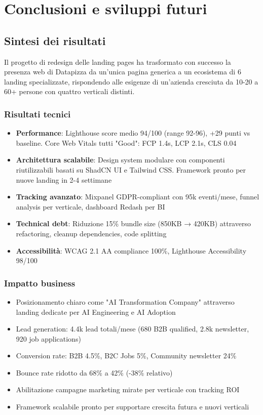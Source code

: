 \chapter{Conclusioni e sviluppi futuri}

\section{Sintesi dei risultati}
Il progetto di redesign delle landing pages ha trasformato con successo 
la presenza web di Datapizza da un'unica pagina generica a un 
ecosistema di 6 landing specializzate, rispondendo alle esigenze di 
un'azienda cresciuta da 10-20 a 60+ persone con quattro verticali 
distinti.

\subsection{Risultati tecnici}
\begin{itemize}
  \item \textbf{Performance}: Lighthouse score medio 94/100 (range 92-96), 
        +29 punti vs baseline. Core Web Vitals tutti "Good": FCP 1.4s, 
        LCP 2.1s, CLS 0.04
  \item \textbf{Architettura scalabile}: Design system modulare con 
        componenti riutilizzabili basati su ShadCN UI e Tailwind CSS. 
        Framework pronto per nuove landing in 2-4 settimane
  \item \textbf{Tracking avanzato}: Mixpanel GDPR-compliant con 95k 
        eventi/mese, funnel analysis per verticale, dashboard Redash 
        per BI
  \item \textbf{Technical debt}: Riduzione 15\% bundle size (850KB → 
        420KB) attraverso refactoring, cleanup dependencies, code splitting
  \item \textbf{Accessibilità}: WCAG 2.1 AA compliance 100\%, 
        Lighthouse Accessibility 98/100
\end{itemize}

\subsection{Impatto business}
\begin{itemize}
  \item Posizionamento chiaro come "AI Transformation Company" attraverso 
        landing dedicate per AI Engineering e AI Adoption
  \item Lead generation: 4.4k lead totali/mese (680 B2B qualified, 
        2.8k newsletter, 920 job applications)
  \item Conversion rate: B2B 4.5\%, B2C Jobs 5\%, Community newsletter 24\%
  \item Bounce rate ridotto da 68\% a 42\% (-38\% relativo)
  \item Abilitazione campagne marketing mirate per verticale con 
        tracking ROI
  \item Framework scalabile pronto per supportare crescita futura e 
        nuovi verticali
\end{itemize}

